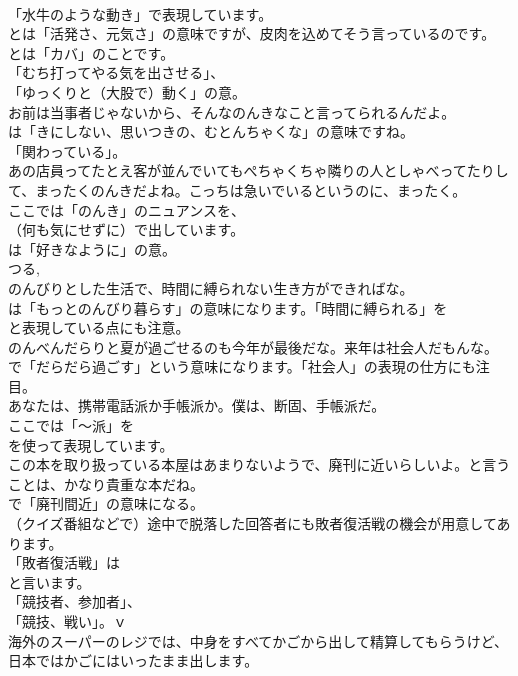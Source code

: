 \documentclass[8pt]{extreport}
\begin{document}
\begin{CJK}{UTF8}{min}
\\	「水牛のような動き」で表現しています。
\\	とは「活発さ、元気さ」の意味ですが、皮肉を込めてそう言っているのです。
\\	とは「カバ」のことです。
\\	「むち打ってやる気を出させる」、
\\	「ゆっくりと（大股で）動く」の意。	
\\	お前は当事者じゃないから、そんなのんきなこと言ってられるんだよ。 
\\	は「きにしない、思いつきの、むとんちゃくな」の意味ですね。
\\	「関わっている」。	
\\	あの店員ってたとえ客が並んでいてもぺちゃくちゃ隣りの人としゃべってたりして、まったくのんきだよね。こっちは急いでいるというのに、まったく。 
\\	ここでは「のんき」のニュアンスを、
\\	（何も気にせずに）で出しています。
\\	は「好きなように」の意。	
\\	つる, 
\\	のんびりとした生活で、時間に縛られない生き方ができればな。 
\\	は「もっとのんびり暮らす」の意味になります。「時間に縛られる」を
\\	と表現している点にも注意。	
\\	のんべんだらりと夏が過ごせるのも今年が最後だな。来年は社会人だもんな。 
\\	で「だらだら過ごす」という意味になります。「社会人」の表現の仕方にも注目。	
\\	あなたは、携帯電話派か手帳派か。僕は、断固、手帳派だ。 
\\	ここでは「～派」を
\\	を使って表現しています。	
\\	この本を取り扱っている本屋はあまりないようで、廃刊に近いらしいよ。と言うことは、かなり貴重な本だね。 
\\	で「廃刊間近」の意味になる。	
\\	（クイズ番組などで）途中で脱落した回答者にも敗者復活戦の機会が用意してあります。 
\\	「敗者復活戦」は
\\	と言います。
\\	「競技者、参加者」、
\\	「競技、戦い」。ｖ	
\\	海外のスーパーのレジでは、中身をすべてかごから出して精算してもらうけど、日本ではかごにはいったまま出します。 

\end{CJK}
\end{document}
